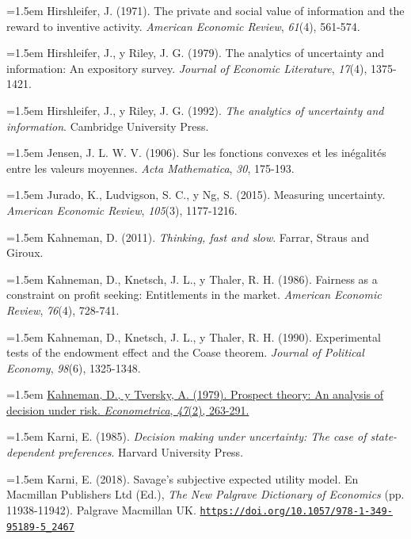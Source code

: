\documentclass[10pt,a4paper]{article}
\begin{document}
\noindent\hangindent=1.5em Hirshleifer, J. (1971). The private and social value of information and the reward to inventive activity. \textit{American Economic Review}, \textit{61}(4), 561-574.

\noindent\hangindent=1.5em Hirshleifer, J., y Riley, J. G. (1979). The analytics of uncertainty and information: An expository survey. \textit{Journal of Economic Literature}, \textit{17}(4), 1375-1421.

\noindent\hangindent=1.5em Hirshleifer, J., y Riley, J. G. (1992). \textit{The analytics of uncertainty and information}. Cambridge University Press.

\noindent\hangindent=1.5em Jensen, J. L. W. V. (1906). Sur les fonctions convexes et les inégalités entre les valeurs moyennes. \textit{Acta Mathematica}, \textit{30}, 175-193.

\noindent\hangindent=1.5em Jurado, K., Ludvigson, S. C., y Ng, S. (2015). Measuring uncertainty. \textit{American Economic Review}, \textit{105}(3), 1177-1216.

\noindent\hangindent=1.5em Kahneman, D. (2011). \textit{Thinking, fast and slow}. Farrar, Straus and Giroux.

\noindent\hangindent=1.5em Kahneman, D., Knetsch, J. L., y Thaler, R. H. (1986). Fairness as a constraint on profit seeking: Entitlements in the market. \textit{American Economic Review}, \textit{76}(4), 728-741.

\noindent\hangindent=1.5em Kahneman, D., Knetsch, J. L., y Thaler, R. H. (1990). Experimental tests of the endowment effect and the Coase theorem. \textit{Journal of Political Economy}, \textit{98}(6), 1325-1348.

\noindent\hangindent=1.5em \href{https://www.jstor.org/stable/1914185}{Kahneman, D., y Tversky, A. (1979). Prospect theory: An analysis of decision under risk. \textit{Econometrica}, \textit{47}(2), 263-291.}

\noindent\hangindent=1.5em Karni, E. (1985). \textit{Decision making under uncertainty: The case of state-dependent preferences}. Harvard University Press.

\noindent\hangindent=1.5em Karni, E. (2018). Savage's subjective expected utility model. En Macmillan Publishers Ltd (Ed.), \textit{The New Palgrave Dictionary of Economics} (pp. 11938-11942). Palgrave Macmillan UK. \href{https://doi.org/10.1057/978-1-349-95189-5_2467}{\nolinkurl{https://doi.org/10.1057/978-1-349-95189-5_2467}}
\end{document}
